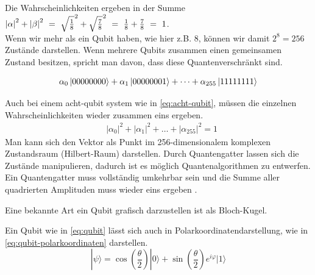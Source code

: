 Die Wahrscheinlichkeiten ergeben in der Summe $\probalpha + \probbeta\ =\ \alphavalue^2+\betavalue^2\ =\ \frac{1}{8}+\frac{7}{8}\ =\ 1$.\\

%
%

Wenn wir mehr als ein Qubit haben, wie hier z.B. 8, können wir damit $2^{8}=256$ Zustände darstellen.
Wenn mehrere Qubits zusammen einen gemeinsamen Zustand besitzen, spricht man davon, dass diese Quantenverschränkt sind.\cite{schmehQuantencomputer2026}

\begin{equation}
    \alpha_0\ket{00000000}+\alpha_1\ket{00000001}+\dots+\alpha_{255}\ket{11111111}
    \label{eq:acht-qubit}
\end{equation}

Auch bei einem acht-qubit system wie in \ref{eq:acht-qubit}, müssen die einzelnen Wahrscheinlichkeiten wieder zusammen eins ergeben.
\begin{align}
    &{\left|\alpha_0\right|}^2+{\left|\alpha_1\right|}^2+\dots+{\left|\alpha_{255}\right|}^2=1
\end{align}
Man kann sich den Vektor als Punkt im 256-dimensionalem komplexen Zustandsraum (Hilbert-Raum) darstellen.
Durch Quantengatter lassen sich die Zustände manipulieren, dadurch ist es möglich Quantenalgorithmen zu entwerfen.
Ein Quantengatter muss vollständig umkehrbar sein und die Summe aller quadrierten Amplituden muss wieder eins ergeben \cite{pospiechQuantencomputerCoGrundideen2021}.

Eine bekannte Art ein Qubit grafisch darzustellen ist als Bloch-Kugel.

Ein Qubit wie in \ref{eq:qubit} lässt sich auch in Polarkoordinatendarstellung, wie in \ref{eq:qubit-polarkoordinaten} darstellen.
\begin{equation}
  |\psi\rangle =
  \cos(\frac{\theta}{2})|0\rangle + \sin(\frac{\theta}{2})e^{i\varphi}|1\rangle
  \label{eq:qubit-polarkoordinaten}
\end{equation}\cite{macchiavello210BlochSphere}

